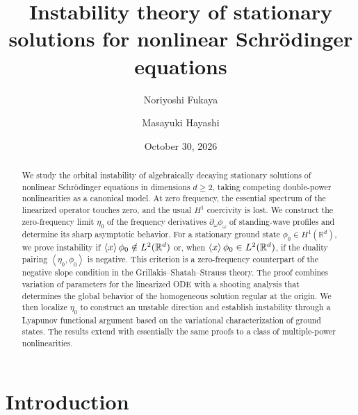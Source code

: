 \documentclass[12pt, a4paper, reqno]{amsart}
\title[]{Instability theory of stationary solutions for nonlinear Schr\"odinger equations}
\author[N. Fukaya]{Noriyoshi Fukaya}
\author[M. Hayashi]{Masayuki Hayashi}
\date{October 30, 2026}
\numberwithin{equation}{section}
\theoremstyle{definition}
\theoremstyle{remark}
\newcommand{\R}{\mathbb R}
\def\tbra[#1,#2]{{\left\langle #1,#2\right\rangle}}
\newcommand{\pt}{\partial}
\begin{document}
\begin{abstract}
We study the orbital instability of algebraically decaying stationary
solutions of nonlinear Schr\"odinger equations in dimensions $d\ge2$,
taking competing double-power nonlinearities as a canonical model.
At zero frequency, the essential spectrum of the linearized operator
touches zero, and the usual $H^1$ coercivity is lost.
We construct the zero-frequency limit $\eta_0$ of the frequency
derivatives $\pt_\omega\phi_\omega$ of standing-wave profiles
and determine its sharp asymptotic behavior.
For a stationary ground state $\phi_0\in H^1(\R^d)$, we prove instability
if $\braket{x}\phi_0\notin L^2(\R^d)$ or, when
$\braket{x}\phi_0\in L^2(\R^d)$, if the duality pairing
$\tbra[\eta_0,\phi_0]$ is negative.
This criterion is a zero-frequency counterpart of the negative slope
condition in the Grillakis--Shatah--Strauss theory.
The proof combines variation of parameters for the linearized ODE
with a shooting analysis that determines the global behavior of
the homogeneous solution regular at the origin.
We then localize $\eta_0$ to construct an unstable direction and
establish instability through a Lyapunov functional argument
based on the variational characterization of ground states.
The results extend with essentially the same proofs to a class of
multiple-power nonlinearities.
\end{abstract}

\maketitle
\tableofcontents

\section{Introduction}
\end{document}

